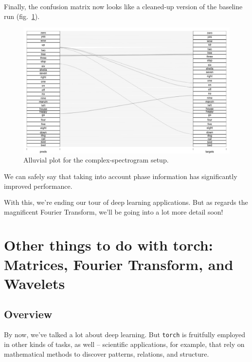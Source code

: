 \documentclass[
  letterpaper,
]{krantz}
\begin{document}
Finally, the confusion matrix now looks like a cleaned-up version of the
baseline run (fig.~\ref{fig-audio-alluvial-complex}).

\begin{figure}[H]

{\centering \includegraphics{images/audio-alluvial-complex.png}

}

\caption{\label{fig-audio-alluvial-complex}Alluvial plot for the
complex-spectrogram setup.}

\end{figure}

We can safely say that taking into account phase information has
significantly improved performance.

With this, we're ending our tour of deep learning applications. But as
regards the magnificent Fourier Transform, we'll be going into a lot
more detail soon!

\part{Other things to do with torch: Matrices, Fourier Transform, and
Wavelets}

\hypertarget{sec:other-overview}{%
\chapter{Overview}\label{sec:other-overview}}

By now, we've talked a lot about deep learning. But \texttt{torch} is
fruitfully employed in other kinds of tasks, as well -- scientific
applications, for example, that rely on mathematical methods to discover
patterns, relations, and structure.
\end{document}
